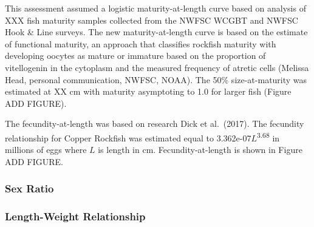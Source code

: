 \documentclass[11pt,
  english,
  a4paper,
]{article}
\begin{document}
\leavevmode\tagmcend\tagstructend\par


This assessment assumed a logistic maturity-at-length curve based on analysis of XXX fish maturity samples collected from the NWFSC WCGBT and NWFSC Hook \& Line surveys. The new maturity-at-length curve is based on the estimate of functional maturity, an approach that classifies rockfish maturity with developing oocytes as mature or immature based on the proportion of vitellogenin in the cytoplasm and the measured frequency of atretic cells (Melissa Head, personal communication, NWFSC, NOAA). The 50\% size-at-maturity was estimated at XX cm with maturity asymptoting to 1.0 for larger fish (Figure ADD FIGURE).

\leavevmode\tagmcend\tagstructend\par


The fecundity-at-length was based on research Dick et al.~{(2017)\leavevmode\tagmcend\tagstructend}. The fecundity relationship for Copper Rockfish was estimated equal to 3.362e-07{\(L\)\leavevmode\tagmcend\tagstructend}\textsuperscript{3.68} in millions of eggs where {\(L\)\leavevmode\tagmcend\tagstructend} is length in cm. Fecundity-at-length is shown in Figure ADD FIGURE.

\leavevmode\tagmcend\tagstructend\par


\hypertarget{sex-ratio}{%
\subsubsection{Sex Ratio}\label{sex-ratio}}

\leavevmode\tagmcend\tagstructend


\hypertarget{length-weight-relationship}{%
\subsubsection{Length-Weight Relationship}\label{length-weight-relationship}}

\leavevmode\tagmcend\tagstructend
\end{document}
